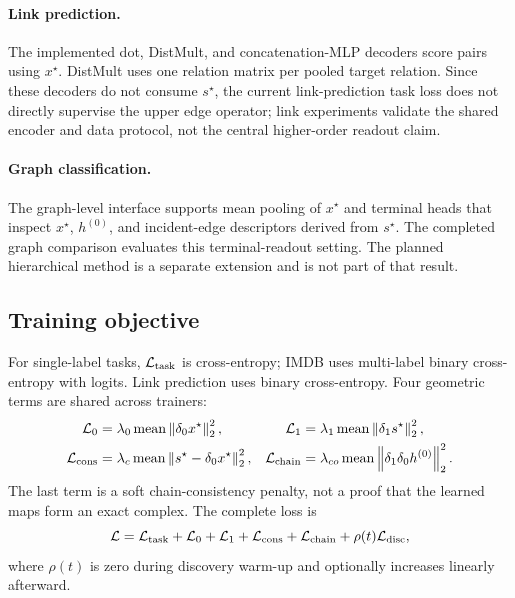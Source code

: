 \paragraph{Link prediction.}
The implemented dot, DistMult, and concatenation-MLP decoders score pairs using $x^\star$.
DistMult uses one relation matrix per pooled target relation. Since these decoders do not consume
$s^\star$, the current link-prediction task loss does not directly supervise the upper edge
operator; link experiments validate the shared encoder and data protocol, not the central
higher-order readout claim.

\paragraph{Graph classification.}
The graph-level interface supports mean pooling of $x^\star$ and terminal heads that inspect
$x^\star$, $h^{(0)}$, and incident-edge descriptors derived from $s^\star$. The completed graph
comparison evaluates this terminal-readout setting. The planned hierarchical \thspool{} method is
a separate extension and is not part of that result.

\subsection{Training objective}

For single-label tasks, $\mathcal{L}_{\mathrm{task}}$ is cross-entropy; IMDB uses multi-label binary
cross-entropy with logits. Link prediction uses binary cross-entropy. Four geometric terms are
shared across trainers:
\begin{align}
  \mathcal{L}_{0} &= \lambda_0\operatorname{mean}\left\lVert \delta_0x^\star\right\rVert_2^2, &
  \mathcal{L}_{1} &= \lambda_1\operatorname{mean}\left\lVert \delta_1s^\star\right\rVert_2^2,\\
  \mathcal{L}_{\mathrm{cons}} &= \lambda_c\operatorname{mean}\left\lVert s^\star-\delta_0x^\star\right\rVert_2^2, &
  \mathcal{L}_{\mathrm{chain}} &= \lambda_{co}\operatorname{mean}
  \left\lVert \delta_1\delta_0h^{(0)}\right\rVert_2^2.
  \label{eq:regularizers}
\end{align}
The last term is a soft chain-consistency penalty, not a proof that the learned maps form an exact
complex. The complete loss is
\begin{equation}
  \mathcal{L}=\mathcal{L}_{\mathrm{task}}+\mathcal{L}_0+\mathcal{L}_1+\mathcal{L}_{\mathrm{cons}}+
  \mathcal{L}_{\mathrm{chain}}+\rho(t)\mathcal{L}_{\mathrm{disc}},
  \label{eq:loss}
\end{equation}
where $\rho(t)$ is zero during discovery warm-up and optionally increases linearly afterward.

